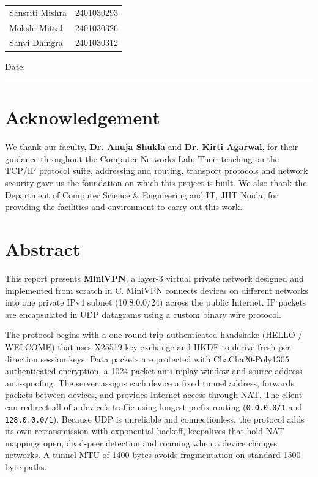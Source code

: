 \documentclass[12pt,a4paper]{report}
\begin{document}
\vspace{2cm}
\noindent
\begin{tabular}{@{}ll@{}}
Sansriti Mishra & 2401030293\\[4pt]
Mokshi Mittal & 2401030326\\[4pt]
Sanvi Dhingra & 2401030312
\end{tabular}

\vspace{1cm}
\noindent Date: \rule{4cm}{0.4pt}

\chapter*{Acknowledgement}
We thank our faculty, \textbf{Dr. Anuja Shukla} and \textbf{Dr. Kirti Agarwal}, for
their guidance throughout the Computer Networks Lab. Their teaching on the TCP/IP
protocol suite, addressing and routing, transport protocols and network security gave
us the foundation on which this project is built. We also thank the Department of
Computer Science \& Engineering and IT, JIIT Noida, for providing the facilities and
environment to carry out this work.

\chapter*{Abstract}
This report presents \textbf{MiniVPN}, a layer-3 virtual private network designed and
implemented from scratch in C. MiniVPN connects devices on different networks into one
private IPv4 subnet (10.8.0.0/24) across the public Internet. IP packets are
encapsulated in UDP datagrams using a custom binary wire protocol.

The protocol begins with a one-round-trip authenticated handshake (HELLO / WELCOME)
that uses X25519 key exchange and HKDF to derive fresh per-direction session keys.
Data packets are protected with ChaCha20-Poly1305 authenticated encryption, a
1024-packet anti-replay window and source-address anti-spoofing. The server assigns
each device a fixed tunnel address, forwards packets between devices, and provides
Internet access through NAT. The client can redirect all of a device's traffic using
longest-prefix routing (\texttt{0.0.0.0/1} and \texttt{128.0.0.0/1}). Because UDP is
unreliable and connectionless, the protocol adds its own retransmission with
exponential backoff, keepalives that hold NAT mappings open, dead-peer detection and
roaming when a device changes networks. A tunnel MTU of 1400 bytes avoids
fragmentation on standard 1500-byte paths.
\end{document}
